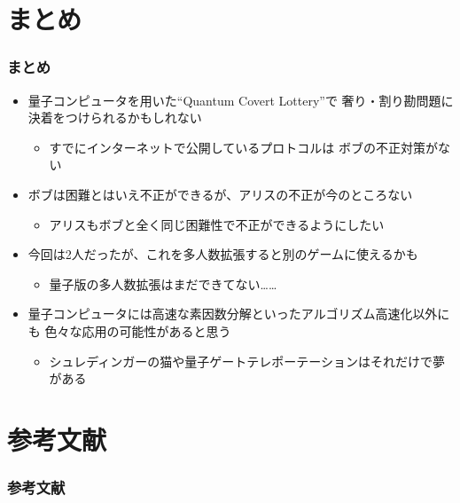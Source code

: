\section{まとめ}

\begin{frame}
  \frametitle{まとめ}

  \pause
  \begin{itemize}
    \item<+-> 量子コンピュータを用いた``Quantum Covert Lottery''で
    奢り・割り勘問題に決着をつけられるかもしれない
    \begin{itemize} 
      \item すでにインターネットで公開しているプロトコル\cite{quantum_covert_lottery}は
      ボブの不正対策がない
    \end{itemize}

    \item<+-> ボブは困難とはいえ不正ができるが、アリスの不正が今のところない
    \begin{itemize} 
      \item アリスもボブと全く同じ困難性で不正ができるようにしたい
    \end{itemize}

    \item<+-> 今回は2人だったが、これを多人数拡張すると別のゲームに使えるかも
    \begin{itemize}
      \item 量子版の多人数拡張はまだできてない……
    \end{itemize}

    \item<+-> 量子コンピュータには高速な素因数分解といったアルゴリズム高速化以外にも
    色々な応用の可能性があると思う
    \begin{itemize}
      \item シュレディンガーの猫や量子ゲートテレポーテーションはそれだけで夢がある
    \end{itemize}
  \end{itemize}
\end{frame}

\section*{参考文献}
\begin{frame}[allowframebreaks]
  \frametitle{参考文献}
  \nocite{*}
  
  
\end{frame}

